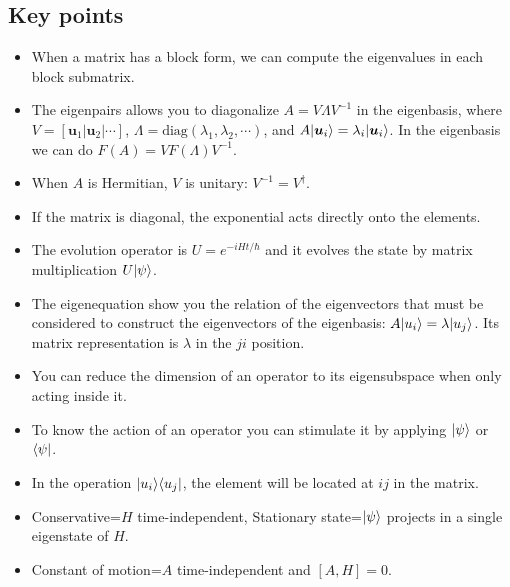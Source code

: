 \subsection*{Key points}
\begin{itemize}[itemsep=0pt,topsep=0pt]
    \item When a matrix has a block form, we can compute the eigenvalues in each block submatrix.
    \item The eigenpairs allows you to diagonalize $A=V\Lambda V^{-1}$ in the eigenbasis, where $V=[\bm{u}_1|\bm{u}_2|\cdots]$, $\Lambda=\text{diag}(\lambda_1,\lambda_2,\cdots)$, and 
    $A|\bm{u}_i\rangle=\lambda_i|\bm{u}_i\rangle$. In the eigenbasis we can do $F(A)=VF(\Lambda)V^{-1}$.
    \item When $A$ is Hermitian, $V$ is unitary: $V^{-1}=V^\dagger$.
    \item If the matrix is diagonal, the exponential acts directly onto the elements.
    \item The evolution operator is $U=e^{-iHt/\hbar}$ and it evolves the state by matrix multiplication $U|\psi\rangle$.
    \item The eigenequation show you the relation of the eigenvectors that must be considered to construct the eigenvectors of the eigenbasis: $A|u_i\rangle=\lambda|u_j\rangle$.
    Its matrix representation is $\lambda$ in the $ji$ position.
    \item You can reduce the dimension of an operator to its eigensubspace when only acting inside it.
    \item To know the action of an operator you can stimulate it by applying $|\psi\rangle$ or $\langle\psi|$.
    \item In the operation $|u_i\rangle\langle u_j|$, the element will be located at $ij$ in the matrix.
    \item Conservative=$H$ time-independent, Stationary state=$|\psi\rangle$ projects in a single eigenstate of $H$.
    \item Constant of motion=$A$ time-independent and $[A,H]=0$.
\end{itemize}